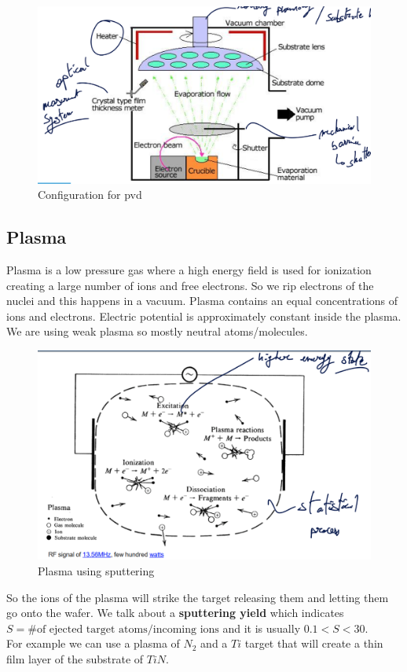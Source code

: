\documentclass{report}
\begin{document}
\begin{figure}[H]
    \centering
    \includegraphics[width=0.5\linewidth]{config_PVD.png}
    \caption{Configuration for \gls{pvd}}
    \label{fig:pvd-conf-label}
\end{figure}

\subsection{Plasma}

Plasma is a low pressure gas where a high energy field is used for ionization creating a large number of ions and free electrons. So we rip electrons of the nuclei and this happens in a vacuum. Plasma contains an equal concentrations of ions and electrons. Electric potential is approximately constant inside the plasma. We are using weak plasma so mostly neutral atoms/molecules.

\begin{figure}[H]
    \centering
    \includegraphics[width=0.51\linewidth]{plasma.png}
    \caption{Plasma using sputtering}
    \label{fig:plasma-sputtering-label}
\end{figure}

So the ions of the plasma will strike the target releasing them and letting them go onto the wafer. We talk about a \textbf{sputtering yield} which indicates $S = \text{\# of ejected target atoms} / \text{incoming ions}$ and it is usually $0.1<S<30$.\\

For example we can use a plasma of $N_2$ and a $Ti$ target that will create a thin film layer of the substrate of $TiN$.\\
\end{document}
